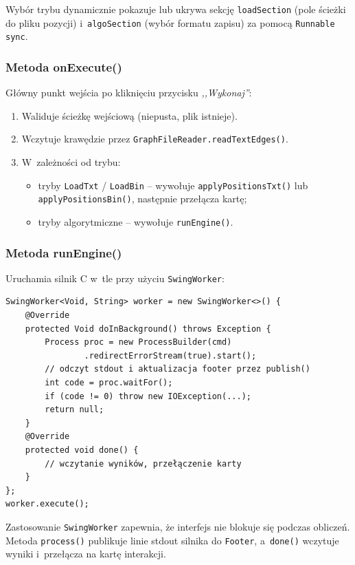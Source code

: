 \documentclass[12pt]{article}
\begin{document}
Wybór trybu dynamicznie pokazuje lub ukrywa sekcję \texttt{loadSection}
(pole ścieżki do pliku pozycji) i~\texttt{algoSection} (wybór formatu zapisu)
za pomocą \texttt{Runnable sync}.

\subsubsection{Metoda onExecute()}

Główny punkt wejścia po kliknięciu przycisku \emph{,,Wykonaj''}:
\begin{enumerate}
    \item Waliduje ścieżkę wejściową (niepusta, plik istnieje).
    \item Wczytuje krawędzie przez \texttt{GraphFileReader.readTextEdges()}.
    \item W~zależności od trybu:
    \begin{itemize}
        \item tryby \texttt{LoadTxt} / \texttt{LoadBin} -- wywołuje
              \texttt{applyPositionsTxt()} lub \texttt{applyPositionsBin()},
              następnie przełącza kartę;
        \item tryby algorytmiczne -- wywołuje \texttt{runEngine()}.
    \end{itemize}
\end{enumerate}

\subsubsection{Metoda runEngine()}

Uruchamia silnik C w~tle przy użyciu \texttt{SwingWorker}:

\begin{lstlisting}
SwingWorker<Void, String> worker = new SwingWorker<>() {
    @Override
    protected Void doInBackground() throws Exception {
        Process proc = new ProcessBuilder(cmd)
                .redirectErrorStream(true).start();
        // odczyt stdout i aktualizacja footer przez publish()
        int code = proc.waitFor();
        if (code != 0) throw new IOException(...);
        return null;
    }
    @Override
    protected void done() {
        // wczytanie wyników, przełączenie karty
    }
};
worker.execute();
\end{lstlisting}

Zastosowanie \texttt{SwingWorker} zapewnia, że interfejs nie blokuje się
podczas obliczeń. Metoda \texttt{process()} publikuje linie stdout silnika
do \texttt{Footer}, a~\texttt{done()} wczytuje wyniki i~przełącza na kartę
interakcji.
\end{document}

